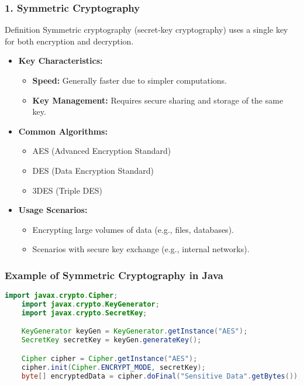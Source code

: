 \documentclass{beamer}
\begin{document}
\begin{frame}[fragile]
    \frametitle{1. Symmetric Cryptography}
    \begin{block}{Definition}
        Symmetric cryptography (secret-key cryptography) uses a single key for both encryption and decryption.
    \end{block}
    \begin{itemize}
        \item \textbf{Key Characteristics:}
            \begin{itemize}
                \item \textbf{Speed:} Generally faster due to simpler computations.
                \item \textbf{Key Management:} Requires secure sharing and storage of the same key.
            \end{itemize}
        \item \textbf{Common Algorithms:}
            \begin{itemize}
                \item AES (Advanced Encryption Standard)
                \item DES (Data Encryption Standard)
                \item 3DES (Triple DES)
            \end{itemize}
        \item \textbf{Usage Scenarios:}
            \begin{itemize}
                \item Encrypting large volumes of data (e.g., files, databases).
                \item Scenarios with secure key exchange (e.g., internal networks).
            \end{itemize}
    \end{itemize}
\end{frame}

\begin{frame}[fragile]
    \frametitle{Example of Symmetric Cryptography in Java}
    \begin{lstlisting}[language=Java]
    import javax.crypto.Cipher;
    import javax.crypto.KeyGenerator;
    import javax.crypto.SecretKey;

    KeyGenerator keyGen = KeyGenerator.getInstance("AES");
    SecretKey secretKey = keyGen.generateKey();

    Cipher cipher = Cipher.getInstance("AES");
    cipher.init(Cipher.ENCRYPT_MODE, secretKey);
    byte[] encryptedData = cipher.doFinal("Sensitive Data".getBytes());
    \end{lstlisting}
\end{frame}
\end{document}
